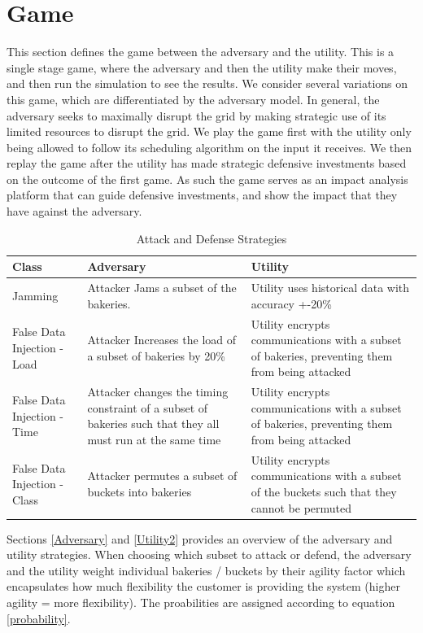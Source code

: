 \documentclass[conference]{IEEEtran}
\begin{document}
\section{Game}
\label{Game}

This section defines the game between the adversary and the utility. This is a single stage game, where the adversary and then the utility make their moves, and then run the simulation to see the results. We consider several variations on this game, which are differentiated by the adversary model. In general, the adversary seeks to maximally disrupt the grid by making strategic use of its limited resources to disrupt the grid. We play the game first with the utility only being allowed to follow its scheduling algorithm on the input it receives. We then replay the game after the utility has made strategic defensive investments based on the outcome of the first game. As such the game serves as an impact analysis platform that can guide defensive investments, and show the impact that they have against the adversary.  

\begin{table}[!htbp]
\label{strategies}
\centering
\begin{tabular}{p{2cm} | p{3cm} | p{3cm}}
\toprule
Class & Adversary & Utility\\
\midrule
Jamming & Attacker Jams a subset of the bakeries.  & Utility uses historical data with accuracy +-20\% \\
False Data Injection - Load &  Attacker Increases the load of a subset of bakeries by 20\% & Utility encrypts communications with a subset of bakeries, preventing them from being attacked \\
False Data Injection - Time & Attacker changes the timing constraint of a subset of bakeries such that they all must run at the same time & Utility encrypts communications with a subset of bakeries, preventing them from being attacked \\
False Data Injection - Class & Attacker permutes a subset of buckets into bakeries & Utility encrypts communications with a subset of the buckets such that they cannot be permuted\\
\bottomrule
\end{tabular}
\caption{Attack and Defense Strategies}
\end{table}

Sections \ref{Adversary} and \ref{Utility2} provides an overview of the adversary and utility strategies.  When choosing which subset to attack or defend, the adversary and the utility weight individual bakeries / buckets by their agility factor \cite{petersen2013taxonomy} which encapsulates how much flexibility the customer
is providing the system (higher agility = more flexibility).  The proabilities are assigned according to equation \ref{probability}.
\end{document}
